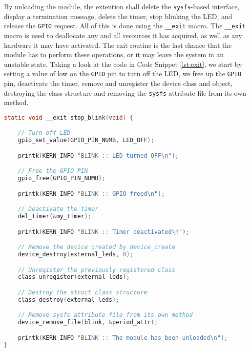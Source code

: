 \documentclass[a4paper,oneside,onecolumn]{article}
\newcommand{\code}[1]{\colorbox{codegray}{\texttt{#1}}}
\begin{document}
By unloading the module, the extention shall delete the \texttt{sysfs}-based interface, display a termination message, delete the timer, stop blinking the LED, and release the \texttt{GPIO} request. All of this is done using the \code{\_\_exit} macro. The \code{\_\_exit} macro is used to deallocate any and all resources it has acquired, as well as any hardware it may have activated. The exit routine is the last chance that the module has to perform these operations, or it may leave the system in an unstable state.
\newline
\newline
Taking a look at the code in Code Snippet \ref{lst:exit}, we start by setting a value of low on the \texttt{GPIO} pin to turn off the LED, we free up the \texttt{GPIO} pin, deactivate the timer, remove and unregister the device class and object, destroying the class structure and removing the \texttt{sysfs} attribute file from its own method.

\begin{lstlisting}[language=c, label={lst:exit}, caption={Unloading of the Module}]
static void __exit stop_blink(void) {

    // Turn off LED
    gpio_set_value(GPIO_PIN_NUMB, LED_OFF);

    printk(KERN_INFO "BLINK :: LED turned OFF\n");

    // Free the GPIO PIN
    gpio_free(GPIO_PIN_NUMB);

    printk(KERN_INFO "BLINK :: GPIO freed\n");

    // Deactivate the timer
    del_timer(&my_timer);

    printk(KERN_INFO "BLINK :: Timer deactivated\n");

    // Remove the device created by device_create
    device_destroy(external_leds, 0);

    // Unregister the previously registered class
    class_unregister(external_leds);

    // Destroy the struct class structure
    class_destroy(external_leds);

    // Remove sysfs attribute file from its own method
    device_remove_file(blink, &period_attr);

    printk(KERN_INFO "BLINK :: The module has been unloaded\n");
}
\end{lstlisting}
\end{document}

